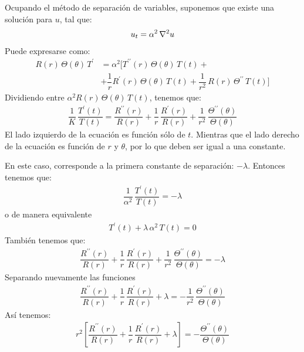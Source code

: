 \documentclass[12pt]{article}
\newcommand{\pderivada}[1]{\ensuremath{{#1}^{\prime}}}
\newcommand{\sderivada}[1]{\ensuremath{{#1}^{\prime \prime}}}
\numberwithin{equation}{section}
\begin{document}
Ocupando el método de separación de variables, suponemos que existe una solución para $u$, tal que:
\begin{align*}
u_{t} = \alpha^{2} \, \laplacian{u}
\end{align*}
Puede expresarse como:
\begin{align*}
R (r) \, \Theta (\theta) \, T^{\prime} &= \alpha^{2} \bigg[ \sderivada{T} (r) \, \Theta (\theta) \, T(t) + \\[0.5em]
&+ \dfrac{1}{r} \pderivada{R} (r) \, \Theta(\theta) \, T(t) + \dfrac{1}{r^{2}} \, R(r) \, \sderivada{\Theta} \, T(t) \bigg]
\end{align*}
Dividiendo entre $\alpha^{2} R(r) \, \Theta (\theta) \, T(t)$, tenemos que:
\begin{align}
\dfrac{1}{K} \, \dfrac{\pderivada{T} (t)}{T (t)} = \dfrac{\sderivada{R} (r)}{R (r)} + \dfrac{1}{r} \, \dfrac{\pderivada{R} (r)}{R (r)} + \dfrac{1}{r^{2}} \, \dfrac{\sderivada{\Theta} (\theta)}{\Theta (\theta)}
\label{eq:ecuacion_K01}
\end{align}
El lado izquierdo de la ecuación es función sólo de $t$. Mientras que el lado derecho de la ecuación es función de $r$ y $\theta$, por lo que deben ser igual a una constante.
\par
En este caso, corresponde a la primera constante de separación: $- \lambda$. Entonces tenemos que:
\begin{align*}
\dfrac{1}{\alpha^{2}} \, \dfrac{\pderivada{T} (t)}{T (t)} = - \lambda
\end{align*}
o de manera equivalente
\begin{align}
\pderivada{T}(t) + \lambda \, \alpha^{2} \, T(t) = 0
\label{eq:ecuacion_K02}    
\end{align}
También tenemos que:
\begin{align*}
\dfrac{\sderivada{R} (r)}{R (r)} + \dfrac{1}{r} \, \dfrac{\pderivada{R} (r)}{R (r)} + \dfrac{1}{r^{2}} \, \dfrac{\sderivada{\Theta} (\theta)}{\Theta (\theta)} = - \lambda
\end{align*}
Separando nuevamente las funciones
\begin{align*}
\dfrac{\sderivada{R} (r)}{R (r)} + \dfrac{1}{r} \, \dfrac{\pderivada{R} (r)}{R (r)} + \lambda = - \dfrac{1}{r^{2}} \, \dfrac{\sderivada{\Theta} (\theta)}{\Theta (\theta)}
\end{align*}
Así tenemos:
\begin{align}
r^{2} \left[ \dfrac{\sderivada{R} (r)}{R (r)} + \dfrac{1}{r} \, \dfrac{\pderivada{R} (r)}{R (r)} + \lambda \right] = - \dfrac{\sderivada{\Theta} (\theta)}{\Theta (\theta)}
\label{eq:ecuacion_K03}    
\end{align}
\end{document}
